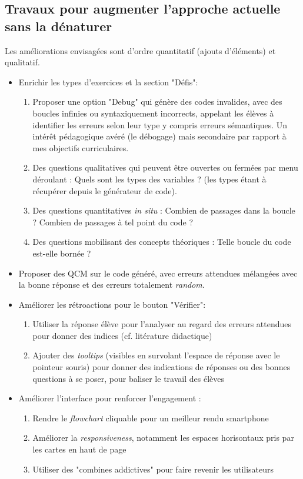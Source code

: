 \documentclass[11pt,a4paper]{article}
\begin{document}
\subsection{Travaux pour augmenter l'approche actuelle sans la dénaturer}
Les améliorations envisagées sont d'ordre quantitatif (ajouts d'éléments) et qualitatif.

\begin{itemize}
    \item Enrichir les types d'exercices et la section "Défis": 
    \begin{enumerate}
        \item Proposer une option "Debug" qui génère des codes invalides, avec des boucles infinies ou syntaxiquement incorrects, appelant les élèves à identifier les erreurs selon leur type y compris erreurs sémantiques. Un intérêt pédagogique avéré (le débogage) mais secondaire par rapport à mes objectifs curriculaires.
        \item Des questions qualitatives qui peuvent être ouvertes ou fermées par menu déroulant : Quels sont les types des variables ? (les types étant à récupérer depuis le générateur de code).
        \item Des questions quantitatives \textit{in situ} : Combien de passages dans la boucle ? Combien de passages à tel point du code ?
        \item Des questions mobilisant des concepts théoriques : Telle boucle du code est-elle bornée ? 
    \end{enumerate}

    \item Proposer des QCM sur le code généré, avec erreurs attendues mélangées avec la bonne réponse et des erreurs totalement \textit{random}.
    
    \item Améliorer les rétroactions pour le bouton "Vérifier":
    \begin{enumerate}
        \item Utiliser la réponse élève pour l'analyser au regard des erreurs attendues pour donner des indices (cf. litérature didactique)
        \item Ajouter des \textit{tooltips} (visibles en survolant l'espace de réponse avec le pointeur souris) pour donner des indications de réponses ou des bonnes questions à se poser, pour baliser le travail des élèves
    \end{enumerate}
    
    \item Améliorer l'interface pour renforcer l'engagement :
    \begin{enumerate}
        \item Rendre le \textit{flowchart} cliquable pour un meilleur rendu smartphone
        \item Améliorer la \textit{responsiveness}, notamment les espaces horisontaux pris par les cartes en haut de page
        \item Utiliser des "combines addictives" pour faire revenir les utilisateurs
    \end{enumerate}



\end{itemize}
\end{document}
